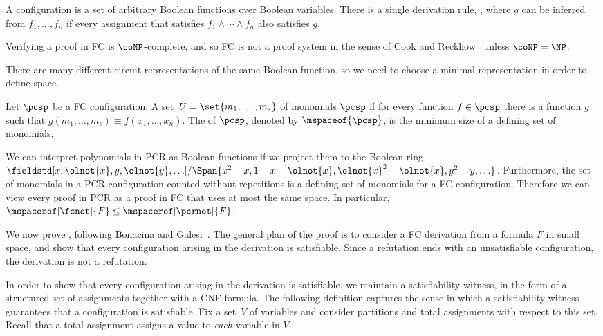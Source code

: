 \documentclass{toc}
\begin{document}
\begin{definition}
  \label{def:fc}
A  configuration is a set of arbitrary Boolean functions over Boolean variables. There is a single derivation rule, , where $g$ can be inferred from $f_1,\ldots,f_n$ if every assignment that satisfies $f_1\land\cdots\land f_n$ also satisfies $g$.
\end{definition}

Verifying a proof in FC is $\coNP$-complete, and so FC is not a proof system in the sense of Cook and Reckhow~\cite{CR79Relative} unless $\coNP = \NP$.

There are many different circuit representations of the same Boolean function, so we need to choose a minimal representation in order to define space.

\begin{definition}
  \label{def:fcspace}
  Let $\pcsp$ be a FC configuration. A %
  set~$U=\set{m_1,\ldots,m_s}$ of monomials
   $\pcsp$ if for every function $f\in\pcsp$ there is a function $g$ such that $g(m_1,\ldots,m_s)\equiv f(x_1,\ldots,x_n)$. The  of $\pcsp$, denoted by $\mspaceof{\pcsp}$, is the minimum size of a %
  defining set of monomials.
\end{definition}

We can interpret polynomials in PCR as Boolean functions if we project them to the Boolean ring $\fieldstd[x,\olnot{x}, y, \olnot{y}, \ldots]/\Span{x^2-x,1-x-\olnot{x},\olnot{x}^2-\olnot{x},y^2-y,\ldots}$. Furthermore, the set of monomials in a PCR configuration counted without repetitions is a %
defining set of monomials
for a FC configuration. Therefore we can view every proof in PCR as a proof in FC that uses at most the same space. In particular, $\mspaceref[\fcnot]{F}\leq \mspaceref[\pcrnot]{F}$.

We now prove , following Bonacina and Galesi~\cite{BG15Framework}. The general plan of the proof is to consider a FC derivation from a formula $F$ in small space, and show that every configuration arising in the derivation is satisfiable. Since a refutation ends with an unsatisfiable configuration, the derivation is not a refutation.

In order to show that every configuration arising in the derivation is satisfiable, we maintain a satisfiability witness, in the form of a structured set of assignments together with a CNF formula.  The following definition captures the sense in which a satisfiability witness guarantees that a configuration is satisfiable. Fix a %
set~$V$ of variables
and consider partitions and total assignments with respect to this set.
Recall that a total assignment assigns a value to \emph{each} variable in $V$.
\end{document}
